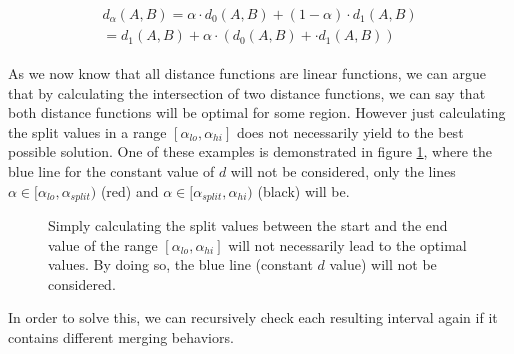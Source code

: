 \begin{equation}
    \begin{aligned}
        \begin{gathered}
        d_\alpha(A,B) = \alpha \cdot d_0(A,B) + (1-\alpha) \cdot d_1(A,B)\\
        = d_1(A,B) + \alpha \cdot (d_0(A,B) + \cdot d_1(A,B))
        \end{gathered}
    \end{aligned}
    \label{eq:linear}
\end{equation}

As we now know that all distance functions are linear functions, we can argue that by calculating the intersection of two distance functions, we can say that both distance functions will be optimal for some region. However just calculating the split values in a range $[\alpha_{lo}, \alpha_{hi}]$ does not necessarily yield to the best possible solution. One of these examples is demonstrated in figure \ref{fig:notoptimal}, where the blue line for the constant value of $d$ will not be considered, only the lines $\alpha \in [\alpha_{lo}, \alpha_{split})$ (red) and $\alpha \in [\alpha_{split}, \alpha_{hi})$ (black) will be.

\begin{figure}
    \centering
    \caption{Simply calculating the split values between the start and the end value of the range $[\alpha_{lo}, \alpha_{hi}]$ will not necessarily lead to the optimal values. By doing so, the blue line (constant $d$ value) will not be considered.}
    \label{fig:notoptimal}
\end{figure}

In order to solve this, we can recursively check each resulting interval again if it contains different merging behaviors.

